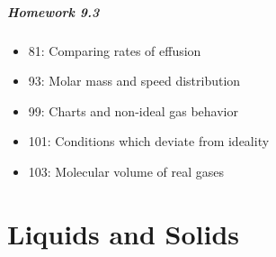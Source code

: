 \documentclass[12pt, openany, letterpaper]{memoir}
\begin{document}
\paragraph*{Homework 9.3}
\begin{itemize}
  \item 81: Comparing rates of effusion
  \item 93: Molar mass and speed distribution
  \item 99: Charts and non-ideal gas behavior
  \item 101: Conditions which deviate from ideality
  \item 103: Molecular volume of real gases
\end{itemize}
\chapter{Liquids and Solids}
\end{document}
